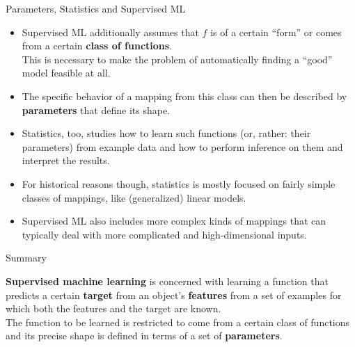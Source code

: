 \documentclass[11pt,compress,t,notes=noshow, xcolor=table]{beamer}
\begin{document}
\begin{vbframe}{Parameters, Statistics and Supervised ML}

\begin{itemize}

  \item Supervised ML additionally assumes that $f$ is of a certain 
  \enquote{form} or comes from a certain \textbf{class of functions}.\\
  This is necessary to make the problem of automatically finding a 
  \enquote{good} model feasible at all.
  
  \item The specific behavior of a mapping from this class can then be 
  described by \textbf{parameters} that define its shape.
  
  \item Statistics, too, studies how to learn such functions (or, rather: their 
  parameters) from example data and how to perform inference on them and 
  interpret the results.
  
  \item For historical reasons though, statistics is mostly focused on fairly 
  simple classes of mappings, like (generalized) linear models.
  
  \item Supervised ML also includes more complex kinds of mappings that can 
  typically deal with more complicated and high-dimensional inputs.

\end{itemize} 

\end{vbframe}


\begin{vbframe}{Summary}

\medskip

\textbf{Supervised machine learning} is concerned with learning a function 
that predicts a certain \textbf{target} from an object's \textbf{features} 
from a set of examples for which both the features and the target are known.\\
The function to be learned is restricted to come from a certain class of 
functions and its precise shape is defined in terms of a set of 
\textbf{parameters}.

\end{vbframe}


\endlecture
\end{document}
